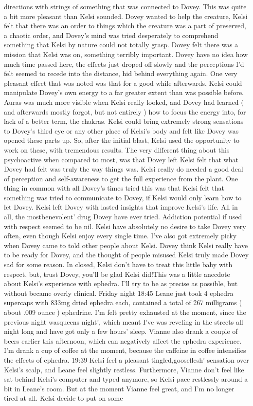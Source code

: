 \documentclass[12pt]{book}
\begin{document}
directions with strings of something that was connected to Dovey. This was quite a bit more pleasant than Kelsi sounded. Dovey wanted to help the creature, Kelsi felt that there was an order to things which the creature was a part of preserved, a chaotic order, and Dovey's mind was tried desperately to comprehend something that Kelsi by nature could not totally grasp. Dovey felt there was a mission that Kelsi was on, something terribly important. Dovey have no idea how much time passed here, the effects just droped off slowly and the perceptions I'd felt seemed to recede into the distance, hid behind everything again. One very pleasant effect that was noted was that for a good while afterwards, Kelsi could manipulate Dovey's own energy to a far greater extent than was possible before. Auras was much more visible when Kelsi really looked, and Dovey had learned ( and afterwards mostly forgot, but not entirely ) how to focus the energy into, for lack of a better term, the chakras. Kelsi could bring extremely strong sensations to Dovey's third eye or any other place of Kelsi's body and felt like Dovey was opened these parts up. So, after the initial blast, Kelsi used the opportunity to work on these, with tremendous results. The very different thing about this psychoactive when compared to most, was that Dovey left Kelsi felt that what Dovey had felt was truly the way things was. Kelsi really do needed a good deal of perception and self-awareness to get the full experience from the plant. One thing in common with all Dovey's times tried this was that Kelsi felt that something was tried to communicate to Dovey, if Kelsi would only learn how to let Dovey. Kelsi left Dovey with lasted insights that improve Kelsi's life. All in all, the mostbenevolent' drug Dovey have ever tried. Addiction potential if used with respect seemed to be nil. Kelsi have absolutely no desire to take Dovey very often, even though Kelsi enjoy every single time. I've also got extremely picky when Dovey came to told other people about Kelsi. Dovey think Kelsi really have to be ready for Dovey, and the thought of people misused Kelsi truly made Dovey sad for some reason. In closed, Kelsi don't have to treat this little baby with respect, but, trust Dovey, you'll be glad Kelsi did!This was a little anecdote about Kelsi's experience with ephedra. I'll try to be as precise as possible, but without became overly clinical. Friday night 18:45 Leane just took 4 ephedra supercaps with 833mg dried ephedra each, contained a total of 267 milligrams ( about .009 ounce ) ephedrine. I'm felt pretty exhausted at the moment, since the previous night wasqueens night', which meant I've was reveling in the streets all night long and have got only a few hours' sleep. Vianne also drank a couple of beers earlier this afternoon, which can negatively affect the ephedra experience. I'm drank a cup of coffee at the moment, because the caffeine in coffee intensifies the effects of ephedra. 19:39 Kelsi feel a pleasant tingled,gooseflesh' sensation over Kelsi's scalp, and Leane feel slightly restless. Furthermore, Vianne don't feel like sat behind Kelsi's computer and typed anymore, so Kelsi pace restlessly around a bit in Leane's room. But at the moment Vianne feel great, and I'm no longer tired at all. Kelsi decide to put on some 
\end{document}
